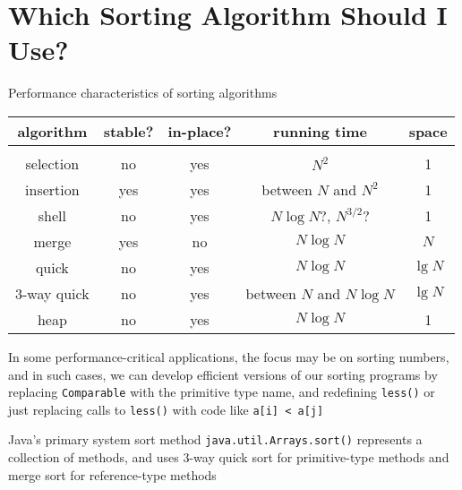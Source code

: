 \documentclass[8pt,a4paper,compress]{beamer}
\begin{document}
\section{Which Sorting Algorithm Should I Use?}
\begin{frame}[fragile]
\pause

Performance characteristics of sorting algorithms
\begin{center}
\begin{tabular}{ccccc}
algorithm & stable? & in-place? & running time & space \\ \hline \\
selection & no & yes & $N^2$ & 1 \\
insertion & yes & yes & between $N$ and $N^2$ & 1 \\
shell & no & yes & $N\log N$?, $N^{3/2}$? & 1 \\
merge & yes & no & $N\log N$ & $N$ \\
quick & no & yes & $N\log N$ & $\lg N$ \\
3-way quick & no & yes & between $N$ and $N\log N$ & $\lg N$ \\
heap & no & yes & $N\log N$ & 1
\end{tabular} 
\end{center}

\pause
\bigskip

In some performance-critical applications, the focus may be on sorting numbers, and in such cases, we can develop efficient versions of our sorting programs by replacing \lstinline$Comparable$ with the primitive type name, and redefining \lstinline$less()$ or just replacing calls to \lstinline$less()$ with code like \lstinline$a[i] < a[j]$

\pause
\bigskip

Java's primary system sort method  \lstinline$java.util.Arrays.sort()$ represents a collection of methods, and uses 3-way quick sort for primitive-type methods and merge sort for reference-type methods
\end{frame}
\end{document}
